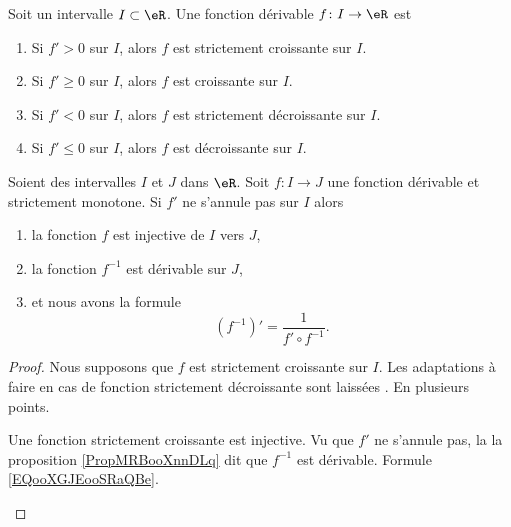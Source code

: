 \begin{proposition}      \label{PROPooKZPZooWjIsWg}
	Soit un intervalle \( I\subset \eR\).  Une fonction dérivable \( f\colon I\to \eR\) est
	\begin{enumerate}
		\item
		      Si \( f'>0\) sur \( I\), alors \( f\) est strictement croissante sur \( I\).
		\item		\label{ITEMooKMDXooPBnVoi}
		      Si \( f'\geq 0\) sur \( I\), alors \( f\) est croissante sur \( I\).
		\item
		      Si \( f'<0\) sur \( I\), alors \( f\) est strictement décroissante sur \( I\).
		\item
		      Si \( f'\leq 0\) sur \( I\), alors \( f\) est décroissante sur \( I\).
	\end{enumerate}
\end{proposition}

\begin{proposition}      \label{PROPooSGTBooFxUuXK}
	Soient des intervalles \( I\) et \( J\) dans \( \eR\).  Soit \(f \colon I\to J \) une fonction dérivable et strictement monotone. Si \( f'\)  ne s'annule pas sur \( I\) alors
	\begin{enumerate}
		\item       \label{ITEMooFXHYooRNHYPI}
		      la fonction \( f\) est injective de \( I\) vers \( J\),
		\item       \label{ITEMooWPPIooDUAYsH}
		      la fonction \( f^{-1}\) est dérivable sur \( J\),
		\item       \label{ITEMooTVMLooQgjLEB}
		      et nous avons la formule
		      \begin{equation}        \label{EQooELIHooDxUFxH}
			      (f^{-1})'=\frac{1}{ f'\circ f^{-1} }.
		      \end{equation}
	\end{enumerate}
\end{proposition}

\begin{proof}
	Nous supposons que \( f\) est strictement croissante sur \( I\). Les adaptations à faire en cas de fonction strictement décroissante sont laissées . En plusieurs points.
	\begin{subproof}
		Une fonction strictement croissante est injective.
		Vu que \( f'\) ne s'annule pas, la la proposition \ref{PropMRBooXnnDLq} dit que \( f^{-1}\) est dérivable.
		Formule \ref{EQooXGJEooSRaQBe}.
	\end{subproof}
\end{proof}

